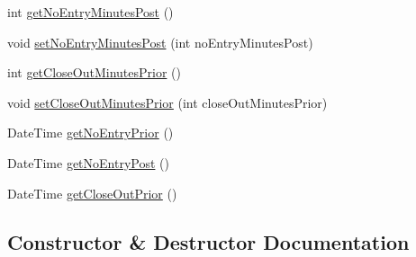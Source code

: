 \begin{DoxyCompactItemize}
\item 
int \hyperlink{class_m_q_l4_c_sharp_1_1_user_defined_1_1_input_1_1_news_report_afeba43df83aa37eaf4fa0d18e4ccaf26}{get\+No\+Entry\+Minutes\+Post} ()
\item 
void \hyperlink{class_m_q_l4_c_sharp_1_1_user_defined_1_1_input_1_1_news_report_aa5094a815b91640438dab9f10291338d}{set\+No\+Entry\+Minutes\+Post} (int no\+Entry\+Minutes\+Post)
\item 
int \hyperlink{class_m_q_l4_c_sharp_1_1_user_defined_1_1_input_1_1_news_report_a8f262628c67961199b513e1757761aec}{get\+Close\+Out\+Minutes\+Prior} ()
\item 
void \hyperlink{class_m_q_l4_c_sharp_1_1_user_defined_1_1_input_1_1_news_report_afcb6da24ecc8fde09cc2068c38f5f4b0}{set\+Close\+Out\+Minutes\+Prior} (int close\+Out\+Minutes\+Prior)
\item 
Date\+Time \hyperlink{class_m_q_l4_c_sharp_1_1_user_defined_1_1_input_1_1_news_report_a0aa8f9693dae66e9298401841b44bf7e}{get\+No\+Entry\+Prior} ()
\item 
Date\+Time \hyperlink{class_m_q_l4_c_sharp_1_1_user_defined_1_1_input_1_1_news_report_a2fc81c089395675e0d1fef21ac4441c5}{get\+No\+Entry\+Post} ()
\item 
Date\+Time \hyperlink{class_m_q_l4_c_sharp_1_1_user_defined_1_1_input_1_1_news_report_a5fb59af83066ede95b74fac785816e48}{get\+Close\+Out\+Prior} ()
\end{DoxyCompactItemize}


\subsection{Constructor \& Destructor Documentation}

